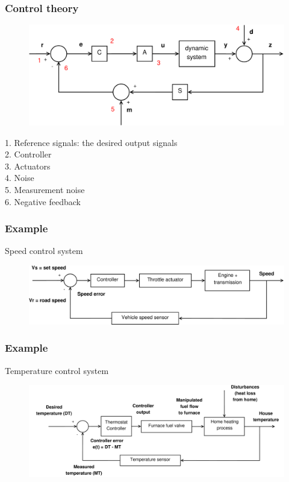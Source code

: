 \begin{frame}
	\frametitle{Control theory}
	\begin{figure}
		\includegraphics[width=.8\linewidth]{full_system2}
	\end{figure}
	\vspace{-2ex}
	1. Reference signals: the desired output signals\\
	2. Controller\\
	3. Actuators\\
	4. Noise\\
	5. Measurement noise\\
	6. Negative feedback
\end{frame}

\begin{frame}
	\frametitle{Example}
	\vspace{-6ex}
	Speed control system\\
	\bigskip
	\bigskip
	\begin{figure}
		\includegraphics[width=1\linewidth]{speed_control_system}
	\end{figure}
\end{frame}


\begin{frame}
	\frametitle{Example}
	\vspace{-3ex}
	Temperature control system\\
	\bigskip
	\begin{figure}
		\includegraphics[width=1\linewidth]{temp_control_system}
	\end{figure}
\end{frame}


